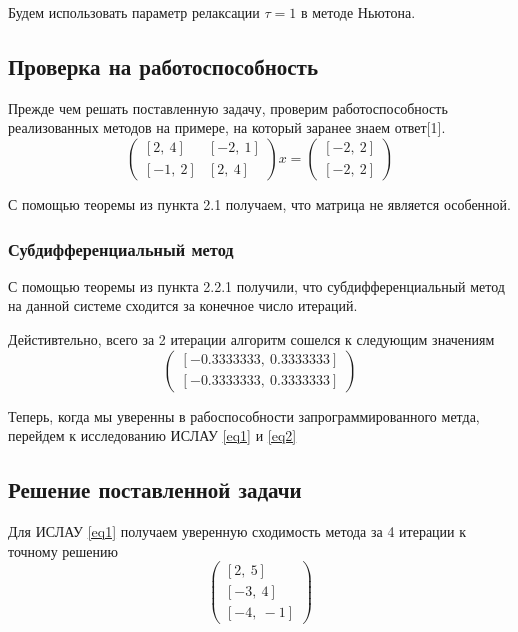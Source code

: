 \documentclass[../body.tex]{subfiles}
\begin{document}
Будем использовать параметр релаксации $\tau=1$ в методе Ньютона.
 \subsection{Проверка на работоспособность}
    Прежде чем решать поставленную задачу, проверим работоспособность реализованных методов на примере, на который заранее знаем ответ[1].
    \begin{equation*}
        \begin{pmatrix}
             [2, \ 4] & [-2, \ 1] \\
             [-1, \ 2]  & [2, \ 4] 
        \end{pmatrix}
        x
        =
        \begin{pmatrix}
             [-2, \ 2] \\
             [-2, \ 2] 
        \end{pmatrix}
        
    \end{equation*}
    
    С помощью теоремы из пункта 2.1 получаем, что матрица не является особенной.
    
    \subsubsection{Субдифференциальный метод}
    С помощью теоремы из пункта 2.2.1 получили, что субдифференциальный метод на данной системе сходится за конечное число итераций.
    
    Дейстивтельно, всего за 2 итерации алгоритм сошелся к следующим значениям 
    \begin{equation*}
        \begin{pmatrix}
             [-0.3333333, \ 0.3333333] \\
             [-0.3333333, \ 0.3333333] 
        \end{pmatrix}
    \end{equation*}
    
    Теперь, когда мы уверенны в рабоспособности запрограммированного метда, перейдем к исследованию ИСЛАУ \ref{eq1} и \ref{eq2}
    \subsection{Решение поставленной задачи}
    Для ИСЛАУ \ref{eq1} получаем уверенную сходимость метода за 4 итерации к точному решению
    \begin{equation*}
        \begin{pmatrix}
             [2, \ 5] \\
             [-3, \ 4] \\
             [-4, \ -1] 
        \end{pmatrix}
    \end{equation*}
\end{document}

